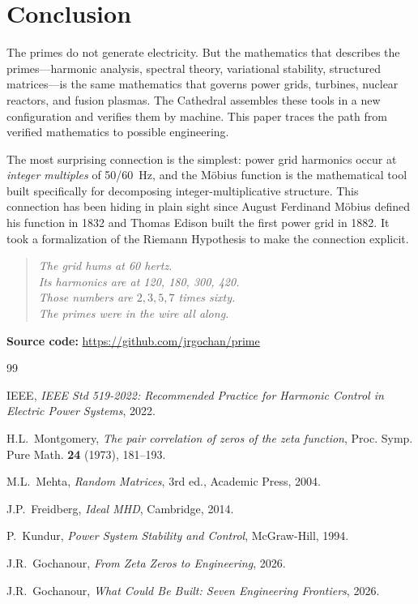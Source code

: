 \documentclass[11pt,a4paper]{article}
\begin{document}
\section{Conclusion}

The primes do not generate electricity. But the mathematics that
describes the primes---harmonic analysis, spectral theory,
variational stability, structured matrices---is the same
mathematics that governs power grids, turbines, nuclear reactors,
and fusion plasmas. The Cathedral assembles these tools in a new
configuration and verifies them by machine. This paper traces the
path from verified mathematics to possible engineering.

The most surprising connection is the simplest: power grid harmonics
occur at \emph{integer multiples} of 50/60~Hz, and the M\"obius
function is the mathematical tool built specifically for decomposing
integer-multiplicative structure. This connection has been hiding in
plain sight since August Ferdinand M\"obius defined his function in
1832 and Thomas Edison built the first power grid in 1882. It took
a formalization of the Riemann Hypothesis to make the connection
explicit.

\begin{quote}
\emph{The grid hums at 60 hertz.\\
Its harmonics are at 120, 180, 300, 420.\\
Those numbers are $2, 3, 5, 7$ times sixty.\\
The primes were in the wire all along.}
\end{quote}

\vspace{0.5cm}
\noindent\textbf{Source code:} \url{https://github.com/jrgochan/prime}

\begin{thebibliography}{99}

IEEE, \emph{IEEE Std 519-2022: Recommended Practice for Harmonic
Control in Electric Power Systems}, 2022.

H.L.~Montgomery, \emph{The pair correlation of zeros of the zeta
function}, Proc. Symp. Pure Math. \textbf{24} (1973), 181--193.

M.L.~Mehta, \emph{Random Matrices}, 3rd ed., Academic Press, 2004.

J.P.~Freidberg, \emph{Ideal MHD}, Cambridge, 2014.

P.~Kundur, \emph{Power System Stability and Control}, McGraw-Hill,
1994.

J.R.~Gochanour, \emph{From Zeta Zeros to Engineering}, 2026.

J.R.~Gochanour, \emph{What Could Be Built: Seven Engineering
Frontiers}, 2026.

\end{thebibliography}
\end{document}
